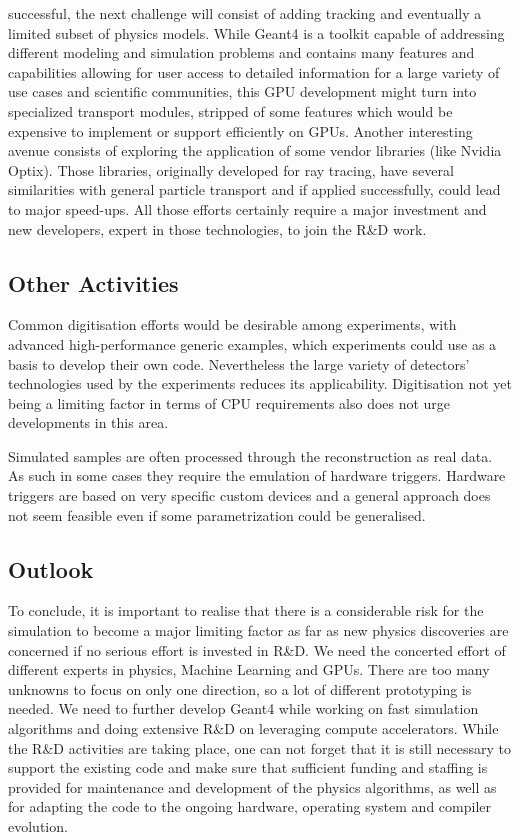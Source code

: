 \documentclass[11pt,a4paper]{article}
\begin{document}
successful, the next challenge will consist of adding tracking and
eventually a limited subset of physics models. While Geant4 is a toolkit
capable of addressing different modeling and simulation problems and
contains many features and capabilities allowing for user access to
detailed information for a large variety of use cases and scientific
communities, this GPU development might turn into specialized transport
modules, stripped of some features which would be expensive to implement
or support efficiently on GPUs. Another interesting avenue consists of
exploring the application of some vendor libraries (like Nvidia Optix).
Those libraries, originally developed for ray tracing, have several
similarities with general particle transport and if applied
successfully, could lead to major speed-ups. All those efforts certainly
require a major investment and new developers, expert in those
technologies, to join the R\&D work.

\hypertarget{other-activities}{%
\subsection{Other Activities}\label{other-activities}}

Common digitisation efforts would be desirable among experiments, with
advanced high-performance generic examples, which experiments could use
as a basis to develop their own code. Nevertheless the large variety of
detectors' technologies used by the experiments reduces its
applicability. Digitisation not yet being a limiting factor in terms of
CPU requirements also does not urge developments in this area.

Simulated samples are often processed through the reconstruction as real
data. As such in some cases they require the emulation of hardware
triggers. Hardware triggers are based on very specific custom devices
and a general approach does not seem feasible even if some
parametrization could be generalised.

\hypertarget{outlook}{%
\subsection{Outlook}\label{outlook}}

To conclude, it is important to realise that there is a considerable
risk for the simulation to become a major limiting factor as far as new
physics discoveries are concerned if no serious effort is invested in
R\&D. We need the concerted effort of different experts in physics,
Machine Learning and GPUs. There are too many unknowns to focus on only
one direction, so a lot of different prototyping is needed. We need to
further develop Geant4 while working on fast simulation algorithms and
doing extensive R\&D on leveraging compute accelerators. While the R\&D
activities are taking place, one can not forget that it is still
necessary to support the existing code and make sure that sufficient
funding and staffing is provided for maintenance and development of the
physics algorithms, as well as for adapting the code to the ongoing
hardware, operating system and compiler evolution.
\end{document}
